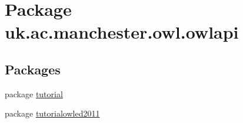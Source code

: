 \hypertarget{namespaceuk_1_1ac_1_1manchester_1_1owl_1_1owlapi}{\section{Package uk.\-ac.\-manchester.\-owl.\-owlapi}
\label{namespaceuk_1_1ac_1_1manchester_1_1owl_1_1owlapi}
}
\subsection*{Packages}
\begin{DoxyCompactItemize}
\item 
package \hyperlink{namespaceuk_1_1ac_1_1manchester_1_1owl_1_1owlapi_1_1tutorial}{tutorial}
\item 
package \hyperlink{namespaceuk_1_1ac_1_1manchester_1_1owl_1_1owlapi_1_1tutorialowled2011}{tutorialowled2011}
\end{DoxyCompactItemize}
